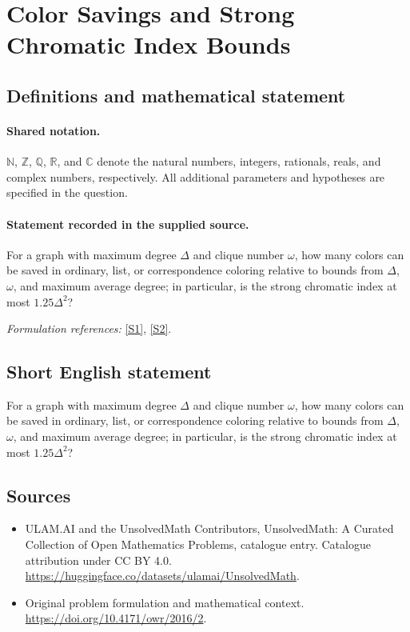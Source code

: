 \documentclass[11pt]{article}
\newcommand{\sref}[2]{\hyperlink{source:#1:#2}{[S#2]}}
\begin{document}
\section{Color Savings and Strong Chromatic Index Bounds}\label{statement}

\subsection{Definitions and mathematical statement}

\paragraph{Shared notation.}$\mathbb N$, $\mathbb Z$, $\mathbb Q$, $\mathbb R$, and $\mathbb C$ denote the natural numbers, integers, rationals, reals, and complex numbers, respectively. All additional parameters and hypotheses are specified in the question.


\paragraph{Statement recorded in the supplied source.}
For a graph with maximum degree $\Delta$ and clique number $\omega$, how many colors can be saved in ordinary, list, or correspondence coloring relative to bounds from $\Delta$, $\omega$, and maximum average degree; in particular, is the strong chromatic index at most $1.25\Delta^2$?
\par\smallskip\textit{Formulation references:} \sref{statement}{1}, \sref{statement}{2}.
\subsection{Short English statement}
For a graph with maximum degree $\Delta$ and clique number $\omega$, how many colors can be saved in ordinary, list, or correspondence coloring relative to bounds from $\Delta$, $\omega$, and maximum average degree; in particular, is the strong chromatic index at most $1.25\Delta^2$?
\subsection{Sources}
\begin{itemize}
\item[\hypertarget{source:statement:1}{S1}] ULAM.AI and the UnsolvedMath Contributors, UnsolvedMath: A Curated Collection of Open Mathematics Problems, catalogue entry. Catalogue attribution under CC BY 4.0.
\url{https://huggingface.co/datasets/ulamai/UnsolvedMath}.
\item[\hypertarget{source:statement:2}{S2}] Original problem formulation and mathematical context.
\url{https://doi.org/10.4171/owr/2016/2}.
\end{itemize}
\label{end:statement}
\end{document}
